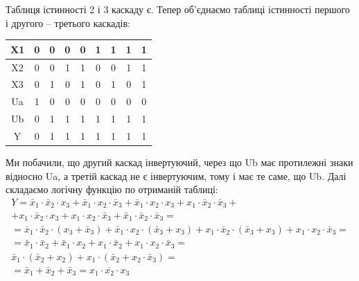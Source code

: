 \documentclass[a4paper,14pt]{extreport}
\begin{document}
  Таблиця істинності 2 і 3 каскаду є. Тепер об’єднаємо таблиці істинності першого і другого – третього каскадів:


  \begin{table}[h]
    \begin{center}
  \begin{tabular}{|c|c|c|c|c|c|c|c|c|}
  \hline
  X1 & 0 & 0 & 0 & 0 & 1 & 1 & 1 & 1 \\ \hline
  X2 & 0 & 0 & 1 & 1 & 0 & 0 & 1 & 1 \\ \hline
  X3 & 0 & 1 & 0 & 1 & 0 & 1 & 0 & 1 \\ \hline
  Ua & 1 & 0 & 0 & 0 & 0 & 0 & 0 & 0 \\ \hline
  Ub & 0 & 1 & 1 & 1 & 1 & 1 & 1 & 1 \\ \hline
  Y  & 0 & 1 & 1 & 1 & 1 & 1 & 1 & 1 \\ \hline
  \end{tabular}
    \end{center}
  \end{table}

  Ми побачили, що другий каскад інвертуючий, через що Ub має протилежні знаки відносно Ua, а третій каскад не є інвертуючим, тому і має те саме, що Ub.
  Далі складаємо логічну функцію по отриманій таблиці:
  \begin{equation}
  \begin{array}{c}
  Y=\bar{x}_{1} \cdot \bar{x}_{2} \cdot x_{3}+\bar{x}_{1} \cdot x_{2} \cdot \bar{x}_{3}+\bar{x}_{1} \cdot x_{2} \cdot x_{3}+x_{1} \cdot \bar{x}_{2} \cdot \bar{x}_{3}+ \\
  +x_{1} \cdot \bar{x}_{2} \cdot x_{3}+x_{1} \cdot x_{2} \cdot \bar{x}_{3}+\bar{x}_{1} \cdot \bar{x}_{2} \cdot \bar{x}_{3}= \\
  =\bar{x}_{1} \cdot \bar{x}_{2} \cdot\left(x_{3}+\bar{x}_{3}\right)+\bar{x}_{1} \cdot x_{2} \cdot\left(\bar{x}_{3}+x_{3}\right)+x_{1} \cdot \bar{x}_{2} \cdot\left(\bar{x}_{3}+x_{3}\right)+x_{1} \cdot x_{2} \cdot \bar{x}_{3}= \\
  =\bar{x}_{1} \cdot \bar{x}_{2}+\bar{x}_{1} \cdot x_{2}+x_{1} \cdot \bar{x}_{2}+x_{1} \cdot x_{2} \cdot \bar{x}_{3}=\\
  \bar{x}_{1} \cdot\left(\bar{x}_{2}+x_{2}\right)+x_{1} \cdot\left(\bar{x}_{2}+x_{2} \cdot \bar{x}_{3}\right)= \\
  =\bar{x}_{1}+\bar{x}_{2}+\bar{x}_{3}=\overline{x_{1} \cdot x_{2} \cdot x_{3}}
  \end{array}
  \end{equation}
\end{document}
